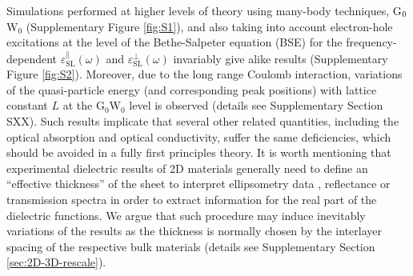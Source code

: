 \documentclass[journal=ancac3,manuscript=article,email=true,hyperref=true,keywords=false]{achemso}
\begin{document}
%
Simulations performed at higher levels of theory using many-body
techniques, G$_{\rm 0}$W$_{0}$ (Supplementary Figure \ref{fig:S1}),
and also taking into account electron-hole excitations at the level of
the Bethe-Salpeter equation (BSE) for the frequency-dependent
$\varepsilon^{\parallel}_{\mathrm{SL}}(\omega)$ and
$\varepsilon^{\perp}_{\mathrm{SL}}(\omega)$ invariably give alike
results (Supplementary Figure \ref{fig:S2}). Moreover, due to the long
range Coulomb interaction, variations of the quasi-particle energy
(and corresponding peak positions) with lattice constant $L$ at the
G$_{0}$W$_{0}$ level is observed (details see Supplementary Section
SXX). Such results implicate that several other related quantities,
including the optical absorption and optical conductivity, suffer the
same deficiencies, which should be avoided in a fully first principles
theory.
%
%
%
%
%
%
%
It is worth mentioning that experimental dielectric results of 2D
materials generally need to define an ``effective thickness'' of the sheet
to interpret ellipsometry data
\cite{graphene-epsilon10,Duesberg14,Chiang13,Kong14}, reflectance or
transmission spectra \cite{Li_2014, Yoffe-Wilson69} in order to
extract information for the real part of the dielectric functions.  We
argue that such procedure may induce inevitably variations of the
results as the thickness is normally chosen by the interlayer spacing
of the respective bulk materials (details see Supplementary Section
\ref{sec:2D-3D-rescale}).
%
%
%
%
%
\end{document}
